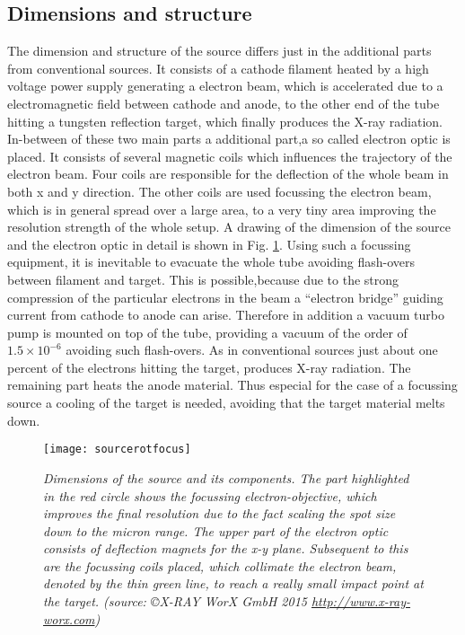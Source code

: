\subsection{Dimensions and structure}\label{subsec:dimstruc}
The dimension and structure of the source differs just in the additional parts from conventional sources. It consists of a cathode filament heated by a high voltage power supply generating a electron beam, which is accelerated due to a electromagnetic field between cathode and anode, to the other end of the tube hitting a tungsten reflection target, which finally produces the X-ray radiation. In-between of these two main parts a additional part,a so called electron optic is placed. It consists of several magnetic coils which influences the trajectory of the electron beam. Four coils are responsible for the deflection of the whole beam in both x and y direction. The other coils are used focussing the electron beam, which is in general spread over a large area, to a very tiny area improving the resolution strength of the whole setup. A drawing of the dimension of the source and the electron optic in detail is shown in Fig. \ref{sourcerotfoc}. Using such a focussing equipment, it is inevitable to evacuate the whole tube avoiding flash-overs between filament and target. This is possible,because due to the strong compression of the particular electrons in the beam a \enquote{electron bridge} guiding current from cathode to anode can arise. Therefore in addition a vacuum turbo pump is mounted on top of the tube, providing a vacuum of the order of $1.5 \times 10^{-6} $ avoiding such flash-overs. As in conventional sources just about one percent of the electrons hitting the target, produces X-ray radiation. The remaining part heats the anode material. Thus especial for the case of a focussing source a cooling of the target is needed, avoiding that the target material melts down.      
\begin{figure}[h]
	\begin{center}
		\texttt{[image: sourcerotfocus]}
	\end{center}
	\caption[Dimensions of the source with focussing system]{\textit{Dimensions of the source and its components. The part highlighted in the red circle shows the focussing electron-objective, which improves the final resolution due to the fact scaling the spot size down to the micron range. The upper part of the electron optic consists of deflection magnets for the x-y plane. Subsequent to this are the focussing coils placed, which collimate the electron beam, denoted by the thin green line, to reach a really small impact point at the target. \tiny{(source: \copyright X-RAY WorX GmbH 2015 \url{http://www.x-ray-worx.com})}}}
	\label{sourcerotfoc}
\end{figure}
